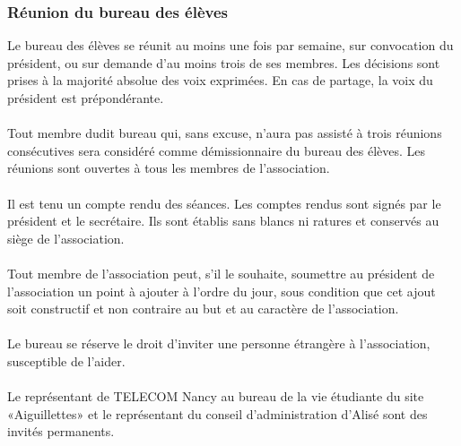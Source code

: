 \documentclass{article} %
\begin{document}
			\subsubsection{Réunion du bureau des élèves}
\label{ssub:reunion_du_bureau_des_eleves}

				Le bureau des élèves se réunit au moins une fois par semaine,
				sur convocation du président, ou sur demande d'au moins trois de
				ses membres. Les décisions sont prises à la majorité absolue des
				voix exprimées. En cas de partage, la voix du président est
				prépondérante. 

              \paragraph{}
				Tout membre dudit bureau qui, sans excuse, n’aura pas assisté à
				trois réunions consécutives sera considéré comme
				démissionnaire du bureau des élèves. Les réunions sont ouvertes
				à tous les membres de l’association.

                \paragraph{}
				Il est tenu un compte rendu des séances. Les comptes rendus sont
				signés par le président et le secrétaire. Ils sont établis sans
				blancs ni ratures et conservés au siège de l’association.

                \paragraph{}
				Tout membre de l’association peut, s’il le souhaite, soumettre
				au président de l’association un point à ajouter à l’ordre du
				jour, sous condition que cet ajout soit constructif et non
				contraire au but et au caractère de l’association.

                \paragraph{}
				Le bureau se réserve le droit d’inviter une personne étrangère à
				l’association, susceptible de l’aider. 

                \paragraph{}
				Le représentant de TELECOM Nancy au bureau de la vie étudiante
				du site «Aiguillettes» et le représentant du conseil
				d’administration d’Alisé sont des invités permanents.
\end{document}
